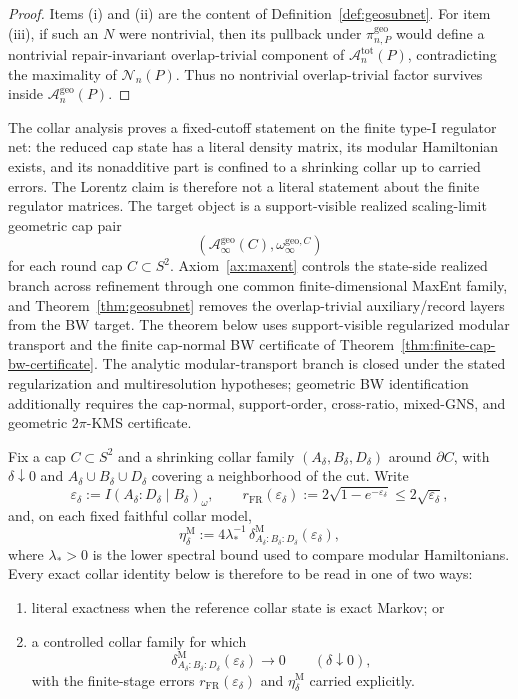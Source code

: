 \documentclass[11pt]{article}
\begin{document}
\begin{proof}
Items \textup{(i)} and \textup{(ii)} are the content of Definition~\ref{def:geosubnet}. For item \textup{(iii)}, if such an \(N\) were nontrivial, then its pullback under \(\pi_{n,P}^{\mathrm{geo}}\) would define a nontrivial repair-invariant overlap-trivial component of \(\mathcal A_n^{\mathrm{tot}}(P)\), contradicting the maximality of \(\mathcal N_n(P)\). Thus no nontrivial overlap-trivial factor survives inside \(\mathcal A_n^{\mathrm{geo}}(P)\).
\end{proof}

The collar analysis proves a fixed-cutoff statement on the finite type-I regulator net: the reduced cap state has a literal density matrix, its modular Hamiltonian exists, and its nonadditive part is confined to a shrinking collar up to carried errors. The Lorentz claim is therefore not a literal statement about the finite regulator matrices. The target object is a support-visible realized scaling-limit geometric cap pair
\[
(\mathcal A_\infty^{\mathrm{geo}}(C),\omega_\infty^{\mathrm{geo},C})
\]
for each round cap \(C\subset S^2\). Axiom~\ref{ax:maxent} controls the state-side realized branch across refinement through one common finite-dimensional MaxEnt family, and Theorem~\ref{thm:geosubnet} removes the overlap-trivial auxiliary/record layers from the BW target. The theorem below uses support-visible regularized modular transport and the finite cap-normal BW certificate of Theorem~\ref{thm:finite-cap-bw-certificate}. The analytic modular-transport branch is closed under the stated regularization and multiresolution hypotheses; geometric BW identification additionally requires the cap-normal, support-order, cross-ratio, mixed-GNS, and geometric \(2\pi\)-KMS certificate.

Fix a cap \(C\subset S^2\) and a shrinking collar family \((A_\delta,B_\delta,D_\delta)\) around \(\partial C\), with \(\delta\downarrow 0\) and \(A_\delta\cup B_\delta\cup D_\delta\) covering a neighborhood of the cut. Write
\[
\varepsilon_\delta:=I(A_\delta:D_\delta\mid B_\delta)_\omega,
\qquad
r_{\mathrm{FR}}(\varepsilon_\delta):=
2\sqrt{1-e^{-\varepsilon_\delta}}
\le 2\sqrt{\varepsilon_\delta},
\]
and, on each fixed faithful collar model,
\[
\eta_\delta^{\mathrm M}
:=
4\lambda_\ast^{-1}\,
\delta^{\mathrm M}_{A_\delta:B_\delta:D_\delta}(\varepsilon_\delta),
\]
where \(\lambda_\ast>0\) is the lower spectral bound used to compare modular Hamiltonians. Every exact collar identity below is therefore to be read in one of two ways:
\begin{enumerate}[leftmargin=2em]
\item literal exactness when the reference collar state is exact Markov; or
\item a controlled collar family for which
\[
\delta^{\mathrm M}_{A_\delta:B_\delta:D_\delta}(\varepsilon_\delta)\to 0
\qquad(\delta\downarrow 0),
\]
with the finite-stage errors \(r_{\mathrm{FR}}(\varepsilon_\delta)\) and \(\eta_\delta^{\mathrm M}\) carried explicitly.
\end{enumerate}
\end{document}
